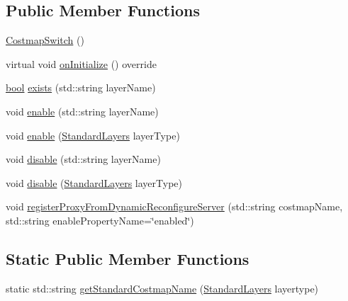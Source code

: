 \subsection*{Public Member Functions}
\begin{DoxyCompactItemize}
\item 
\hyperlink{classcl__move__base__z_1_1CostmapSwitch_a768d35402a2fdc5afce3988b3fe95e94}{Costmap\+Switch} ()
\item 
virtual void \hyperlink{classcl__move__base__z_1_1CostmapSwitch_ad4d125cd563ed0bb76d27226bc47e63e}{on\+Initialize} () override
\item 
\hyperlink{classbool}{bool} \hyperlink{classcl__move__base__z_1_1CostmapSwitch_ae9cfc1152e625763beb7997c5dbed70b}{exists} (std\+::string layer\+Name)
\item 
void \hyperlink{classcl__move__base__z_1_1CostmapSwitch_ad2366ec89f6cb922b6d4a6c8d2627e97}{enable} (std\+::string layer\+Name)
\item 
void \hyperlink{classcl__move__base__z_1_1CostmapSwitch_ac30d812503a62ea594587d8ab552d7c3}{enable} (\hyperlink{classcl__move__base__z_1_1CostmapSwitch_af38aeee5e3893e689cd74ddddfe0df15}{Standard\+Layers} layer\+Type)
\item 
void \hyperlink{classcl__move__base__z_1_1CostmapSwitch_af7cc8007da601736b445c051a6fbd49a}{disable} (std\+::string layer\+Name)
\item 
void \hyperlink{classcl__move__base__z_1_1CostmapSwitch_a37bfce155e049637d8444bb901c880af}{disable} (\hyperlink{classcl__move__base__z_1_1CostmapSwitch_af38aeee5e3893e689cd74ddddfe0df15}{Standard\+Layers} layer\+Type)
\item 
void \hyperlink{classcl__move__base__z_1_1CostmapSwitch_a0d04ca7b655f850ba3107393f1c437cb}{register\+Proxy\+From\+Dynamic\+Reconfigure\+Server} (std\+::string costmap\+Name, std\+::string enable\+Property\+Name=\char`\"{}enabled\char`\"{})
\end{DoxyCompactItemize}
\subsection*{Static Public Member Functions}
\begin{DoxyCompactItemize}
\item 
static std\+::string \hyperlink{classcl__move__base__z_1_1CostmapSwitch_ac46796874242fdaa7efef86b66a55102}{get\+Standard\+Costmap\+Name} (\hyperlink{classcl__move__base__z_1_1CostmapSwitch_af38aeee5e3893e689cd74ddddfe0df15}{Standard\+Layers} layertype)
\end{DoxyCompactItemize}
